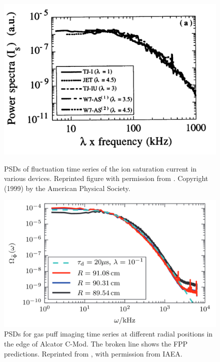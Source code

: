 \begin{figure}
	\centering
	\begin{minipage}{.48\linewidth}
	\includegraphics[width=\linewidth]{figures/pedrosa_psd.png}
	\caption{PSDs of fluctuation time series of the ion saturation current in various devices. Reprinted figure with permission from \cite{pedrosa1999empirical}. Copyright (1999) by the American Physical Society.}
	\label{Fig:pedrosa}
	\end{minipage}
	\hfill
	\begin{minipage}{.48\linewidth}
		\includegraphics[width=\linewidth]{figures/theodorsen_psd.png}
		\caption{PSDs for gas puff imaging time series at different radial positions in the edge of Alcator C-Mod. The broken line shows the FPP predictions. Reprinted from \cite{theodorsen2017relationship}, with permission from IAEA.}
		\label{Fig:theodorsen_psd}
	\end{minipage}
\end{figure}

